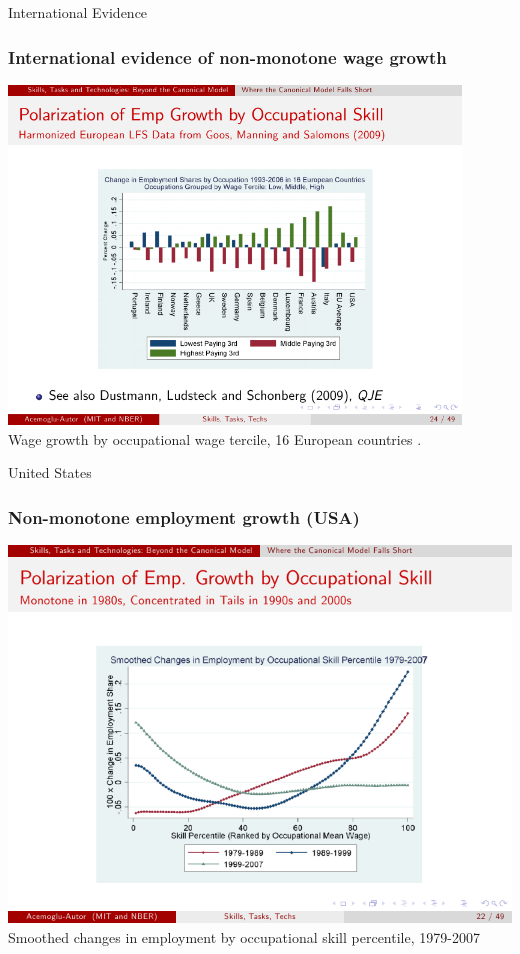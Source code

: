 \documentclass[red]{beamer}
\begin{document}
\begin{frame}[t]{International Evidence}
\frametitle{International evidence of non-monotone wage growth}
\begin{center}
\includegraphics[width=0.9\textwidth]{slides/international_nonmonotone.pdf}
\\
Wage growth by occupational wage tercile, 16 European countries \citep{Acemoglu2011}.
\end{center}
\end{frame}

\begin{frame}[t]{United States}
\frametitle{Non-monotone employment growth (USA)}
\begin{center}
\includegraphics[width=\textwidth]{slides/emp_occ_skill_percentile.pdf}
\\
Smoothed changes in employment by occupational skill percentile, 1979-2007
\citep{Acemoglu2011}
\end{center}
\end{frame}
\end{document}
